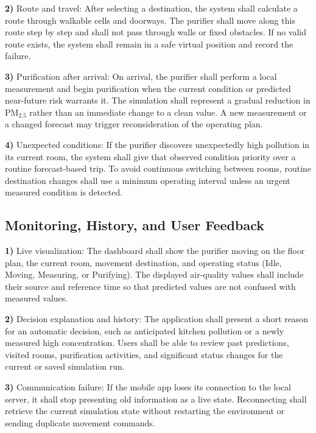\documentclass[conference]{IEEEtran}
\begin{document}
\par\noindent\textbf{2)} Route and travel:
After selecting a destination, the system shall calculate a route through walkable cells and doorways. The purifier shall move along this route step by step and shall not pass through walls or fixed obstacles. If no valid route exists, the system shall remain in a safe virtual position and record the failure.

\par\noindent\textbf{3)} Purification after arrival:
On arrival, the purifier shall perform a local measurement and begin purification when the current condition or predicted near-future risk warrants it. The simulation shall represent a gradual reduction in PM$_{2.5}$ rather than an immediate change to a clean value. A new measurement or a changed forecast may trigger reconsideration of the operating plan.

\par\noindent\textbf{4)} Unexpected conditions:
If the purifier discovers unexpectedly high pollution in its current room, the system shall give that observed condition priority over a routine forecast-based trip. To avoid continuous switching between rooms, routine destination changes shall use a minimum operating interval unless an urgent measured condition is detected.

\subsection{Monitoring, History, and User Feedback}
\par\noindent\textbf{1)} Live visualization:
The dashboard shall show the purifier moving on the floor plan, the current room, movement destination, and operating status (Idle, Moving, Measuring, or Purifying). The displayed air-quality values shall include their source and reference time so that predicted values are not confused with measured values.

\par\noindent\textbf{2)} Decision explanation and history:
The application shall present a short reason for an automatic decision, such as anticipated kitchen pollution or a newly measured high concentration. Users shall be able to review past predictions, visited rooms, purification activities, and significant status changes for the current or saved simulation run.

\par\noindent\textbf{3)} Communication failure:
If the mobile app loses its connection to the local server, it shall stop presenting old information as a live state. Reconnecting shall retrieve the current simulation state without restarting the environment or sending duplicate movement commands.
\end{document}

